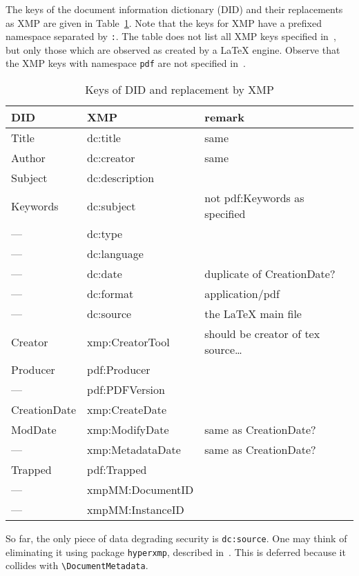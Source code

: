 \documentclass[a4paper, english]{article}%
\newcommand{\cmd}[1]{\texttt{\textbackslash#1}}
\begin{document}
The keys of the document information dictionary (DID) 
and their replacements as XMP are given in Table~\ref{tab:keysDID_XMP}. 
Note that the keys for XMP have a prefixed namespace separated by \texttt{:}. 
The table does not list all XMP keys specified in~\cite{ISO16684-1}, 
but only those which are observed as created by a \LaTeX{} engine. 
Observe that the XMP keys with namespace \texttt{pdf} are not specified in~\cite{ISO16684-1}. 


\begin{longtable}{|lll|}
  \toprule
  DID & XMP & remark \\
  \midrule
  \midrule
  \endfirsthead%
  \bottomrule
  \caption{\label{tab:keysDID_XMP} Keys of DID and replacement by XMP}
  \endlastfoot%
  Title        & dc:title   & same\\
  Author       & dc:creator & same \\
  Subject      & dc:description & \\
  Keywords     & dc:subject & not pdf:Keywords as specified \\
  ---          & dc:type & \\
  ---          & dc:language & \\
  ---          & dc:date & duplicate of CreationDate? \\
  ---          & dc:format & application/pdf \\
  ---          & dc:source & the \LaTeX{} main file \\%
  Creator      & xmp:CreatorTool & should be creator of tex source\dots \\
  Producer     & pdf:Producer & \\
  ---          & pdf:PDFVersion & \\
  CreationDate & xmp:CreateDate & \\
  ModDate      & xmp:ModifyDate & same as CreationDate? \\
  ---          & xmp:MetadataDate & same as CreationDate? \\
  Trapped      & pdf:Trapped & \\
  ---          & xmpMM:DocumentID & \\
  ---          & xmpMM:InstanceID & \\
\end{longtable}

So far, the only piece of data degrading security 
is \texttt{dc:source}. 
One may think of eliminating it using package \texttt{hyperxmp}, 
described in~\cite{HyperXmpP}. 
This is deferred because it collides with \cmd{DocumentMetadata}. 
\end{document}
